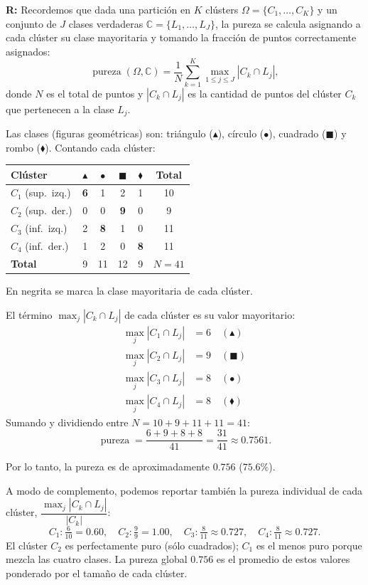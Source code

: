 \textbf{R:} Recordemos que dada una partición en $K$ clústers $\Omega = \{C_1, \dots, C_K\}$ y un conjunto de $J$ clases verdaderas $\mathbb{C} = \{L_1, \dots, L_J\}$, la pureza se calcula asignando a cada clúster su clase mayoritaria y tomando la fracción de puntos correctamente asignados:
\[
    \operatorname{pureza}(\Omega, \mathbb{C}) = \frac{1}{N} \sum_{k=1}^{K} \max_{1 \leq j \leq J} |C_k \cap L_j|,
\]
donde $N$ es el total de puntos y $|C_k \cap L_j|$ es la cantidad de puntos del clúster $C_k$ que pertenecen a la clase $L_j$.

Las clases (figuras geométricas) son: triángulo ($\blacktriangle$), círculo ($\bullet$), cuadrado ($\blacksquare$) y rombo ($\blacklozenge$). Contando cada clúster:
\begin{center}
    \begin{tabular}{lccccc}
        \toprule
        \textbf{Clúster} & $\blacktriangle$ & $\bullet$ & $\blacksquare$ & $\blacklozenge$ & \textbf{Total} \\
        \midrule
        $C_1$ (sup.\ izq.) & \textbf{6} & 1 & 2 & 1 & 10 \\
        $C_2$ (sup.\ der.) & 0 & 0 & \textbf{9} & 0 & 9 \\
        $C_3$ (inf.\ izq.) & 2 & \textbf{8} & 1 & 0 & 11 \\
        $C_4$ (inf.\ der.) & 1 & 2 & 0 & \textbf{8} & 11 \\
        \midrule
        \textbf{Total} & 9 & 11 & 12 & 9 & $N=41$ \\
        \bottomrule
    \end{tabular}
\end{center}
En negrita se marca la clase mayoritaria de cada clúster.

El término $\max_j |C_k \cap L_j|$ de cada clúster es su valor mayoritario:
\begin{align*}
    \max_j |C_1 \cap L_j| &= 6 \quad (\blacktriangle) \\
    \max_j |C_2 \cap L_j| &= 9 \quad (\blacksquare) \\
    \max_j |C_3 \cap L_j| &= 8 \quad (\bullet) \\
    \max_j |C_4 \cap L_j| &= 8 \quad (\blacklozenge)
\end{align*}
Sumando y dividiendo entre $N = 10 + 9 + 11 + 11 = 41$:
\[
    \operatorname{pureza} = \frac{6 + 9 + 8 + 8}{41} = \frac{31}{41} \approx 0.7561.
\]

Por lo tanto, la pureza es de aproximadamente $0.756$ ($75.6\%$).

A modo de complemento, podemos reportar también la pureza individual de cada clúster, $\dfrac{\max_j |C_k \cap L_j|}{|C_k|}$:
\[
    C_1: \tfrac{6}{10} = 0.60, \quad
    C_2: \tfrac{9}{9} = 1.00, \quad
    C_3: \tfrac{8}{11} \approx 0.727, \quad
    C_4: \tfrac{8}{11} \approx 0.727.
\]
El clúster $C_2$ es perfectamente puro (sólo cuadrados); $C_1$ es el menos puro porque mezcla las cuatro clases. La pureza global $0.756$ es el promedio de estos valores ponderado por el tamaño de cada clúster.
